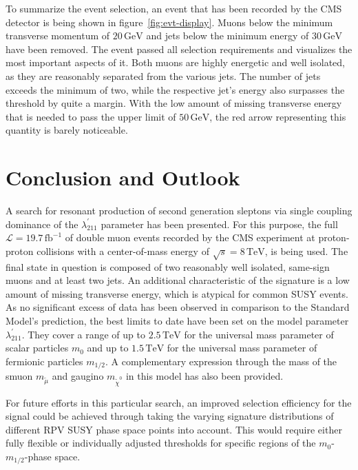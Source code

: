 \noindent To summarize the event selection, an event that has been recorded by the CMS detector is being shown in figure~\ref{fig:evt-display}. Muons below the minimum transverse momentum of $20\,\text{GeV}$ and jets below the minimum energy of $30\,\text{GeV}$ have been removed. The event passed all selection requirements and visualizes the most important aspects of it. Both muons are highly energetic and well isolated, as they are reasonably separated from the various jets. The number of jets exceeds the minimum of two, while the respective jet's energy also surpasses the threshold by quite a margin. With the low amount of missing transverse energy that is needed to pass the upper limit of $50\,\text{GeV}$, the red arrow representing this quantity is barely noticeable.

\section{Conclusion and Outlook}
\label{sec:conclusion}

A search for resonant production of second generation sleptons via single coupling dominance of the $\lambda^{\prime}_{211}$ parameter has been presented. For this purpose, the full $\mathcal{L} = 19.7\,\text{fb}^{-1}$ of double muon events recorded by the CMS experiment at proton-proton collisions with a center-of-mass energy of $\sqrt{s} = 8\,\text{TeV}$, is being used. The final state in question is composed of two reasonably well isolated, same-sign muons and at least two jets. An additional characteristic of the signature is a low amount of missing transverse energy, which is atypical for common SUSY events. As no significant excess of data has been observed in comparison to the Standard Model's prediction, the best limits to date have been set on the model parameter $\lambda^{\prime}_{211}$. They cover a range of up to $2.5\,\text{TeV}$ for the universal mass parameter of scalar particles $m_0$ and up to $1.5\,\text{TeV}$ for the universal mass parameter of fermionic particles $m_{1/2}$. A complementary expression through the mass of the smuon $m_{\tilde{\mu}}$ and gaugino $m_{\tilde{\chi}^0}$ in this model has also been provided.

For future efforts in this particular search, an improved selection efficiency for the signal could be achieved through taking the varying signature distributions of different RPV SUSY phase space points into account. This would require either fully flexible or individually adjusted thresholds for specific regions of the $m_0$-$m_{1/2}$-phase space.

